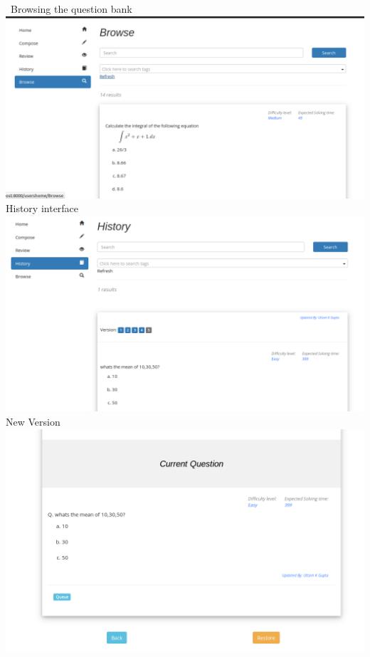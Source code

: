 \documentclass[a4paper,12pt,oneside]{book}
\begin{document}
\
Browsing the question bank\\
\includegraphics[scale=0.3]{browse.png}	\\

History interface\\
\includegraphics[scale=0.3]{history.png}	\\

\newpage \vspace{2in}
New Version \\
\includegraphics[scale=0.4]{version1.png}	\\
\end{document}
